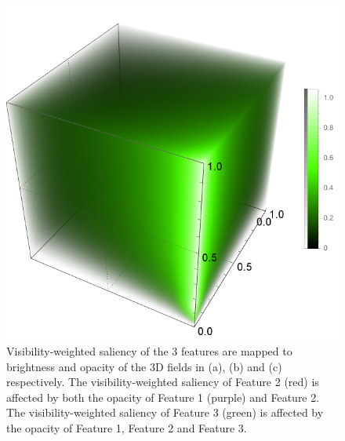 \begin{figure}
\begin{minipage}{.3\textwidth}
	\end{minipage}
	\begin{minipage}{.3\textwidth}
		\includegraphics[width=1\linewidth]{figures/nucleon_strong_red_densityplot3}
	\end{minipage}
	\caption[Visibility-weighted saliency of the 3 features are mapped to brightness and opacity respectively.]{Visibility-weighted saliency of the 3 features are mapped to brightness and opacity of the 3D fields in (a), (b) and (c) respectively. The visibility-weighted saliency of Feature 2 (red) is affected by both the opacity of Feature 1 (purple) and Feature 2. The visibility-weighted saliency of Feature 3 (green) is affected by the opacity of Feature 1, Feature 2 and Feature 3.}
	\label{fig:nucleon_densityplot}
\end{figure}

